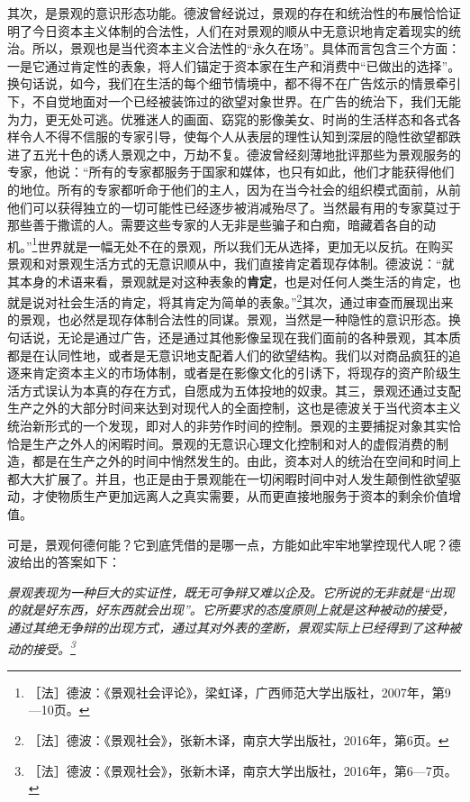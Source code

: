 \documentclass[fontset=fandol, a4paper, 12pt, openright]{ctexbook}
\renewenvironment{quote}
  {\list{}{\rightmargin\leftmargin}%
   \item\relax\small\itshape\color{darkgray}}
  {\endlist}
\begin{document}
其次，是景观的意识形态功能。德波曾经说过，景观的存在和统治性的布展恰恰证明了今日资本主义体制的合法性，人们在对景观的顺从中无意识地肯定着现实的统治。所以，景观也是当代资本主义合法性的“永久在场”。具体而言包含三个方面：一是它通过肯定性的表象，将人们锚定于资本家在生产和消费中“已做出的选择”。换句话说，如今，我们在生活的每个细节情境中，都不得不在广告炫示的情景牵引下，不自觉地面对一个已经被装饰过的欲望对象世界。在广告的统治下，我们无能为力，更无处可逃。优雅迷人的画面、窈窕的影像美女、时尚的生活样态和各式各样令人不得不信服的专家引导，使每个人从表层的理性认知到深层的隐性欲望都跌进了五光十色的诱人景观之中，万劫不复。{\kaishu 德波曾经刻薄地批评那些为景观服务的专家，他说：“所有的专家都服务于国家和媒体，也只有如此，他们才能获得他们的地位。所有的专家都听命于他们的主人，因为在当今社会的组织模式面前，从前他们可以获得独立的一切可能性已经逐步被消减殆尽了。当然最有用的专家莫过于那些善于撒谎的人。需要这些专家的人无非是些骗子和白痴，暗藏着各自的动机。”}\footnote{［法］德波：《景观社会评论》，梁虹译，广西师范大学出版社，2007年，第9—10页。}世界就是一幅无处不在的景观，所以我们无从选择，更加无以反抗。在购买景观和对景观生活方式的无意识顺从中，我们直接肯定着现存体制。德波说：“就其本身的术语来看，景观就是对这种表象的\textbf{肯定}，也是对任何人类生活的肯定，也就是说对社会生活的肯定，将其肯定为简单的表象。”\footnote{［法］德波：《景观社会》，张新木译，南京大学出版社，2016年，第6页。}其次，通过审查而展现出来的景观，也必然是现存体制合法性的同谋。景观，当然是一种隐性的意识形态。换句话说，无论是通过广告，还是通过其他影像呈现在我们面前的各种景观，其本质都是在认同性地，或者是无意识地支配着人们的欲望结构。我们以对商品疯狂的追逐来肯定资本主义的市场体制，或者是在影像文化的引诱下，将现存的资产阶级生活方式误认为本真的存在方式，自愿成为五体投地的奴隶。其三，景观还通过支配生产之外的大部分时间来达到对现代人的全面控制，这也是德波关于当代资本主义统治新形式的一个发现，即对人的非劳作时间的控制。景观的主要捕捉对象其实恰恰是生产之外人的闲暇时间。景观的无意识心理文化控制和对人的虚假消费的制造，都是在生产之外的时间中悄然发生的。由此，资本对人的统治在空间和时间上都大大扩展了。并且，也正是由于景观能在一切闲暇时间中对人发生颠倒性欲望驱动，才使物质生产更加远离人之真实需要，从而更直接地服务于资本的剩余价值增值。

可是，景观何德何能？它到底凭借的是哪一点，方能如此牢牢地掌控现代人呢？德波给出的答案如下：

\begin{quote}
景观表现为一种巨大的实证性，既无可争辩又难以企及。它所说的无非就是“出现的就是好东西，好东西就会出现”。它所要求的态度原则上就是这种被动的接受，通过其绝无争辩的出现方式，通过其对外表的垄断，景观实际上已经得到了这种被动的接受。\footnote{［法］德波：《景观社会》，张新木译，南京大学出版社，2016年，第6—7页。}
\end{quote}
\end{document}
